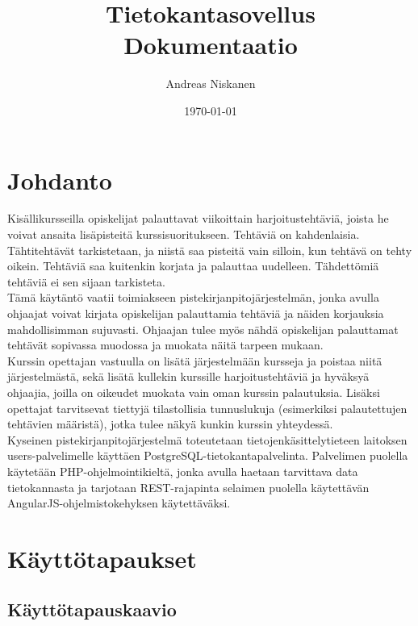 \documentclass[a4paper,12pt, titlepage]{article}
\title{Tietokantasovellus \\ Dokumentaatio}
\author{Andreas Niskanen}
\date{\today}
\begin{document}
\maketitle

\tableofcontents

\newpage

\section{Johdanto}

Kisällikursseilla opiskelijat palauttavat viikoittain harjoitustehtäviä,
joista he voivat ansaita lisäpisteitä kurssisuoritukseen. Tehtäviä on
kahdenlaisia. Tähtitehtävät tarkistetaan, ja niistä saa pisteitä vain
silloin, kun tehtävä on tehty oikein. Tehtäviä saa kuitenkin korjata ja
palauttaa uudelleen. Tähdettömiä tehtäviä ei sen sijaan tarkisteta.\\
Tämä käytäntö vaatii toimiakseen pistekirjanpitojärjestelmän, jonka avulla
ohjaajat voivat kirjata opiskelijan palauttamia tehtäviä ja näiden korjauksia
mahdollisimman sujuvasti. Ohjaajan tulee myös nähdä opiskelijan palauttamat
tehtävät sopivassa muodossa ja muokata näitä tarpeen mukaan.\\
Kurssin opettajan vastuulla on lisätä järjestelmään kursseja ja poistaa
niitä järjestelmästä, sekä lisätä kullekin kurssille harjoitustehtäviä ja
hyväksyä ohjaajia, joilla on oikeudet muokata vain oman kurssin palautuksia.
Lisäksi opettajat tarvitsevat tiettyjä tilastollisia tunnuslukuja (esimerkiksi
palautettujen tehtävien määristä), jotka tulee näkyä kunkin kurssin yhteydessä.\\
Kyseinen pistekirjanpitojärjestelmä toteutetaan tietojenkäsittelytieteen
laitoksen users-palvelimelle käyttäen PostgreSQL-tietokantapalvelinta.
Palvelimen puolella käytetään PHP-ohjelmointikieltä, jonka avulla haetaan
tarvittava data tietokannasta ja tarjotaan REST-rajapinta selaimen puolella
käytettävän AngularJS-ohjelmistokehyksen käytettäväksi.

\newpage

\section{Käyttötapaukset}

\subsection{Käyttötapauskaavio}
\end{document}
